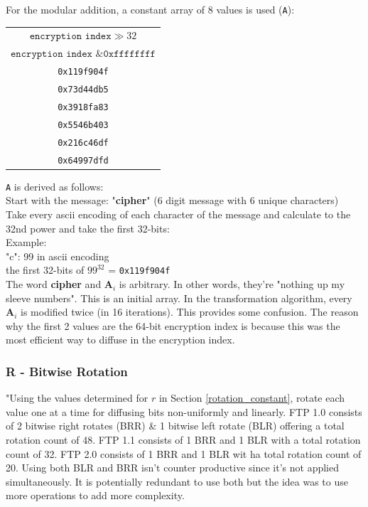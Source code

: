 \documentclass[11pt]{article}
\theoremstyle{definition}
\theoremstyle{remark}
\begin{document}
For the modular addition, a constant array of 8 values is used (\texttt{A}):

\begin{center}
	\begin{tabular}{c}
		$\texttt{encryption index} \gg 32$ \\
		$\texttt{encryption index \& 0xffffffff}$ \\
		\texttt{0x119f904f} \\
		\texttt{0x73d44db5} \\
		\texttt{0x3918fa83} \\
		\texttt{0x5546b403} \\
		\texttt{0x216c46df} \\
		\texttt{0x64997dfd} \\
	\end{tabular}
\end{center}

\texttt{A} is derived as follows:
\\
Start with the message: "\textbf{cipher}" (6 digit message with 6 unique characters)
\\
Take every ascii encoding of each character of the message and calculate to the 32nd power and take the first 32-bits:
\\
Example:\\
"c": 99 in ascii encoding\\
the first 32-bits of $99^{32}$ = \texttt{0x119f904f}
\\
The word \textbf{cipher} and $\textbf{A}_i$ is arbitrary. In other words, they're "nothing up my sleeve numbers". This is an initial array. In the transformation algorithm, every $\textbf{A}_i$ is modified twice (in 16 iterations). This provides some confusion. The reason why the first 2 values are the 64-bit encryption index is because this was the most efficient way to diffuse in the encryption index.

\subsubsection{R - Bitwise Rotation} %

"Using the values determined for $r$ in Section \ref{rotation_constant}, rotate each value one at a time for diffusing bits non-uniformly and linearly. FTP 1.0 consists of 2 bitwise right rotates (BRR) \& 1 bitwise left rotate (BLR) offering a total rotation count of 48. FTP 1.1 consists of 1 BRR and 1 BLR with a total rotation count of 32. FTP 2.0 consists of 1 BRR and 1 BLR wit ha total rotation count of 20. Using both BLR and BRR isn't counter productive since it's not applied simultaneously. It is potentially redundant to use both but the idea was to use more operations to add more complexity.
\end{document}
